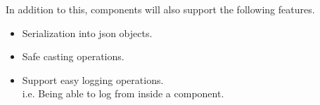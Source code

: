 In addition to this, components will also support the following features.
\begin{itemize}
    \item
    Serialization into json objects.

    \item
    Safe casting operations.

    \item
    Support easy logging operations.\\
    i.e. Being able to log from inside a component.
\end{itemize}